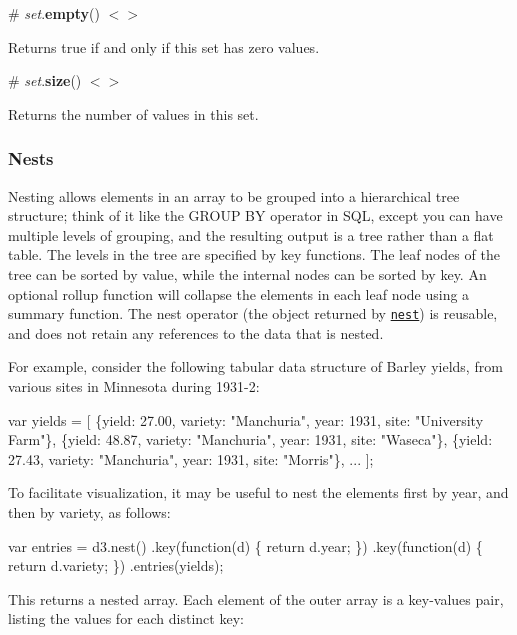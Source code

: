 \label{_set_empty}%
\# {\itshape set}.{\bfseries empty}() \href{https://github.com/d3/d3-collection/blob/master/src/set.js#L19}{\tt $<$$>$}

Returns true if and only if this set has zero values.

\label{_set_size}%
\# {\itshape set}.{\bfseries size}() \href{https://github.com/d3/d3-collection/blob/master/src/set.js#L18}{\tt $<$$>$}

Returns the number of values in this set.

\subsubsection*{Nests}

Nesting allows elements in an array to be grouped into a hierarchical tree structure; think of it like the G\+R\+O\+UP BY operator in S\+QL, except you can have multiple levels of grouping, and the resulting output is a tree rather than a flat table. The levels in the tree are specified by key functions. The leaf nodes of the tree can be sorted by value, while the internal nodes can be sorted by key. An optional rollup function will collapse the elements in each leaf node using a summary function. The nest operator (the object returned by \href{#nest}{\tt nest}) is reusable, and does not retain any references to the data that is nested.

For example, consider the following tabular data structure of Barley yields, from various sites in Minnesota during 1931-\/2\+:


\begin{DoxyCode}
var yields = [
  \{yield: 27.00, variety: "Manchuria", year: 1931, site: "University Farm"\},
  \{yield: 48.87, variety: "Manchuria", year: 1931, site: "Waseca"\},
  \{yield: 27.43, variety: "Manchuria", year: 1931, site: "Morris"\},
  ...
];
\end{DoxyCode}


To facilitate visualization, it may be useful to nest the elements first by year, and then by variety, as follows\+:


\begin{DoxyCode}
var entries = d3.nest()
    .key(function(d) \{ return d.year; \})
    .key(function(d) \{ return d.variety; \})
    .entries(yields);
\end{DoxyCode}


This returns a nested array. Each element of the outer array is a key-\/values pair, listing the values for each distinct key\+:


